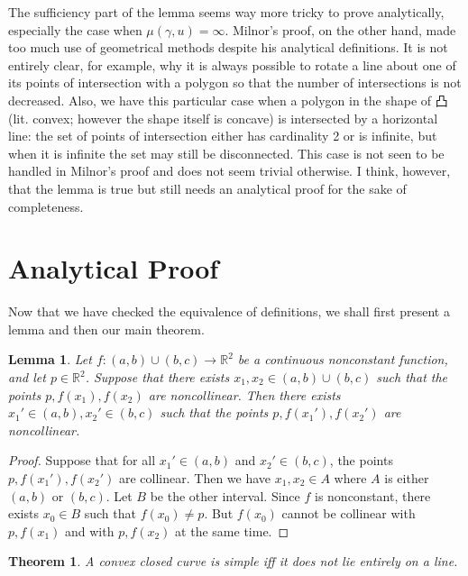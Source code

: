 \documentclass{amsart}
\newtheorem{lemma}[proposition]{Lemma}
\newtheorem{theorem}[proposition]{Theorem}
\theoremstyle{definition}
\theoremstyle{remark}
\begin{document}
The sufficiency part of the lemma seems way more tricky to prove
analytically, especially the case when $\mu(\gamma,u)=\infty$.
Milnor's proof, on the other hand, made too much use of
geometrical methods despite his analytical definitions.
It is not entirely clear, for example, why it is always possible
to rotate a line about one of its points of intersection with
a polygon so that the number of intersections is not decreased.
Also, we have this particular case when a polygon in the shape of 凸
(lit. convex; however the shape itself is concave)
is intersected by a horizontal line: the set of points of intersection
either has cardinality 2 or is infinite, but when it is infinite
the set may still be disconnected. This case is not seen to
be handled in Milnor's proof and does not seem trivial otherwise.
I think, however, that the lemma is true but still needs
an analytical proof for the sake of completeness.

\section{Analytical Proof}

Now that we have checked the equivalence of definitions,
we shall first present a lemma and then our main theorem.

\begin{lemma}
    \label{lem}
    Let $f:(a,b)\cup(b,c)\to\mathbb{R}^2$ be a continuous
    nonconstant function, and let $p\in\mathbb{R}^2$.
    Suppose that there exists $x_1,x_2\in(a,b)\cup(b,c)$ such that
    the points $p,f(x_1),f(x_2)$ are noncollinear.
    Then there exists $x_1'\in(a,b),x_2'\in(b,c)$ such that
    the points $p,f(x_1'),f(x_2')$ are noncollinear.
\end{lemma}

\begin{proof}
    Suppose that for all $x_1'\in(a,b)$ and $x_2'\in(b,c)$,
    the points $p,f(x_1'),f(x_2')$ are collinear.
    Then we have $x_1,x_2\in A$ where
    $A$ is either $(a,b)$ or $(b,c)$. Let $B$ be the other interval.
    Since $f$ is nonconstant, there exists $x_0\in B$
    such that $f(x_0)\ne p$. But $f(x_0)$ cannot be collinear
    with $p,f(x_1)$ and with $p,f(x_2)$ at the same time.
\end{proof}

\begin{theorem}
    \label{thm:main}
    A convex closed curve is simple iff
    it does not lie entirely on a line.
\end{theorem}
\end{document}
